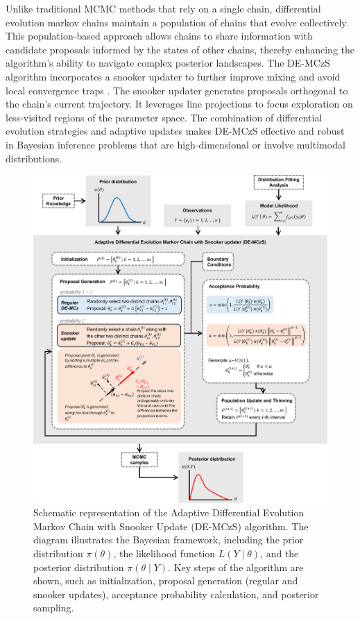 Unlike traditional MCMC methods that rely on a single chain, differential evolution markov chains maintain a population of chains that evolve collectively. This population-based approach allows chains to share information with candidate proposals informed by the states of other chains, thereby enhancing the algorithm's ability to navigate complex posterior landscapes. The DE-MCzS algorithm incorporates a snooker updater to further improve mixing and avoid local convergence traps \citep{Cheng_2014, Cheng_2014_b, Braak_2018}. The snooker updater generates proposals orthogonal to the chain's current trajectory. It leverages line projections to focus exploration on less-visited regions of the parameter space. The combination of differential evolution strategies and adaptive updates makes DE-MCzS effective and robust in Bayesian inference problems that are high-dimensional or involve multimodal distributions.

\begin{figure}[ht!]
    \centering
    \includegraphics[width=1\linewidth]{_plots/DE-MCzS.png}
    \caption{Schematic representation of the Adaptive Differential Evolution Markov Chain with Snooker Update (DE-MCzS) algorithm. The diagram illustrates the Bayesian framework, including the prior distribution $\pi(\theta)$, the likelihood function $L(Y \mid \theta)$, and the posterior distribution $\pi(\theta \mid Y)$. Key steps of the algorithm are shown, such as initialization, proposal generation (regular and snooker updates), acceptance probability calculation, and posterior sampling.}
    \label{fig:DE-MCzS}
\end{figure}

